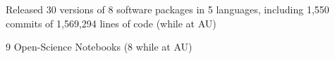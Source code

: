 \begin{veryTightItemize}
    \item Released 30 versions of 8 software packages in 5 languages, including 
        1,550 commits of 1,569,294 lines of code (while at AU)
    \item 9 Open-Science Notebooks (8 while at AU)
\end{veryTightItemize}
